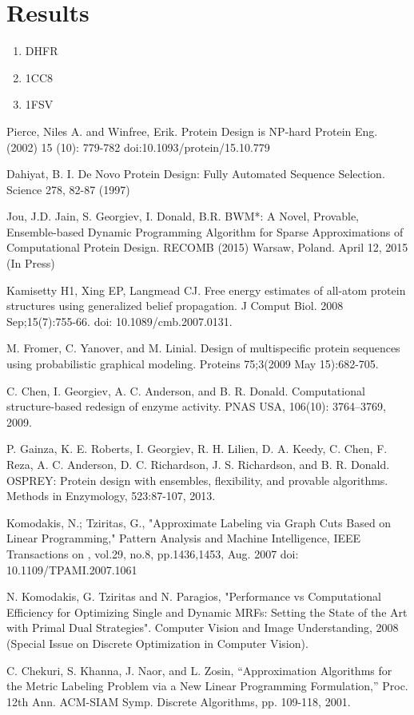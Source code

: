 \documentclass[11pt]{article}
\begin{document}
	\section{Results}
	
	\begin{enumerate}
		\item DHFR
		\item 1CC8
		\item 1FSV
	\end{enumerate}

	\begin{thebibliography}{99}
	
	 Pierce, Niles A. and Winfree, Erik. Protein Design is NP-hard 
	Protein Eng. (2002) 15 (10): 779-782 doi:10.1093/protein/15.10.779
	
	 Dahiyat, B. I. De Novo Protein Design: Fully Automated Sequence
	Selection. Science 278, 82-87 (1997)	

	 Jou, J.D. Jain, S. Georgiev, I. Donald, B.R. BWM*: A Novel,
	Provable, Ensemble-based Dynamic Programming Algorithm for Sparse 
	Approximations of Computational Protein Design. RECOMB (2015) Warsaw, Poland.
	April 12, 2015 (In Press)

	 Kamisetty H1, Xing EP, Langmead CJ. Free energy estimates of
	all-atom protein structures using generalized belief propagation. J Comput
	Biol. 2008 Sep;15(7):755-66. doi: 10.1089/cmb.2007.0131.
		
	 M. Fromer, C. Yanover, and M. Linial. Design of multispecific
	protein sequences using probabilistic graphical modeling. Proteins 75;3(2009
	May 15):682-705.
	
	 C. Chen, I. Georgiev, A. C. Anderson, and B. R. Donald. 
	Computational structure-based redesign of enzyme activity. PNAS USA, 106(10):
	3764–3769, 2009.

	 P. Gainza, K. E. Roberts, I. Georgiev, R. H. Lilien, D. A. Keedy,
	C. Chen, F. Reza, A. C. Anderson, D. C. Richardson, J. S. Richardson, and B. R.
	Donald. OSPREY: Protein design with ensembles, flexibility, and provable
	algorithms. Methods in Enzymology, 523:87-107, 2013.
	
	 Komodakis, N.; Tziritas, G., "Approximate Labeling
	via Graph Cuts Based on Linear Programming," Pattern Analysis and Machine
	Intelligence, IEEE Transactions on , vol.29, no.8, pp.1436,1453, Aug. 2007
	doi: 10.1109/TPAMI.2007.1061	
	
	 N. Komodakis, G. Tziritas and N. Paragios, "Performance vs
	Computational Efficiency for Optimizing Single and Dynamic MRFs: Setting the 
	State of the Art with Primal Dual Strategies". Computer Vision and Image
	Understanding, 2008 (Special Issue on Discrete Optimization in Computer Vision).
	
	 C. Chekuri, S. Khanna, J. Naor, and L. Zosin, “Approximation
	Algorithms for the Metric Labeling Problem via a New Linear Programming
	Formulation,” Proc. 12th Ann. ACM-SIAM Symp. Discrete Algorithms, pp. 109-118,
	2001.
	
	\end{thebibliography}
\end{document}
